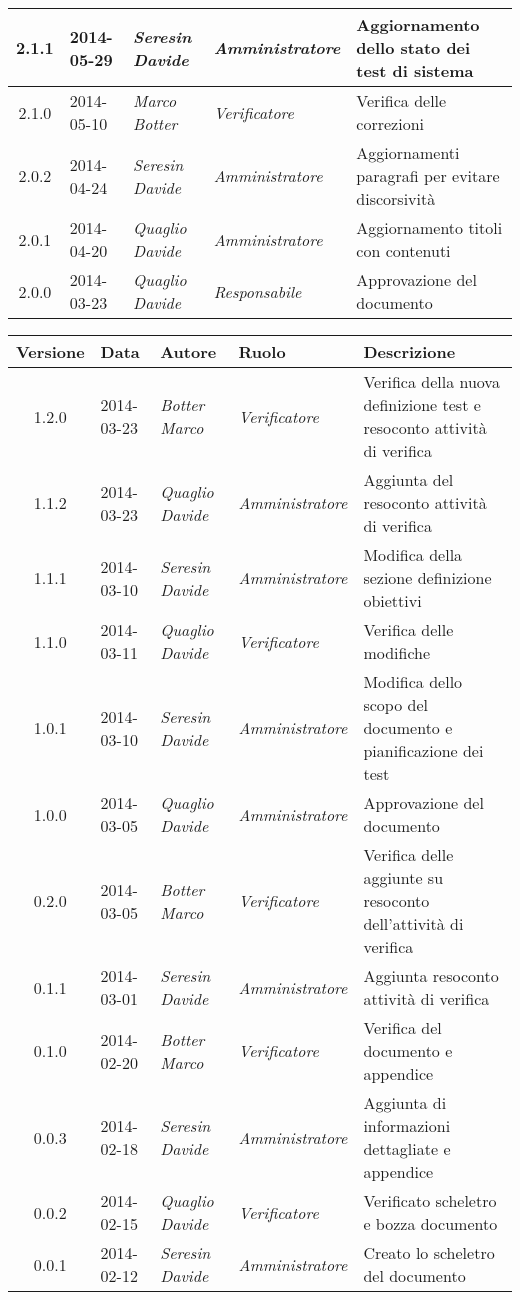 \begin{small}
\begin{tabular}{|c|p{1.8cm}|p{2.8cm}|p{2.8cm}|p{3.5cm}|}
\hline
2.1.1 & 2014-05-29 & 
\textit{Seresin Davide} &
\textit{Amministratore} &  Aggiornamento dello stato dei test di sistema\\
\hline
2.1.0 & 2014-05-10 & 
\textit{Marco Botter} &
\textit{Verificatore} &  Verifica delle correzioni\\
\hline
2.0.2 & 2014-04-24 & 
\textit{Seresin Davide} &
\textit{Amministratore} &  Aggiornamenti paragrafi per evitare discorsività\\
\hline
2.0.1 & 2014-04-20 & 
\textit{Quaglio Davide} &
\textit{Amministratore} &  Aggiornamento titoli con contenuti\\
\hline
2.0.0 & 2014-03-23 & 
\textit{Quaglio Davide} &
\textit{Responsabile} &  Approvazione del documento\\
\hline
\end{tabular}


\begin{tabular}{|c|p{1.8cm}|p{2.8cm}|p{2.8cm}|p{3.5cm}|}
\hline
Versione & Data & Autore & Ruolo & Descrizione \\
\hline
\hline
1.2.0 & 2014-03-23 & 
\textit{Botter Marco} &
\textit{Verificatore} &  Verifica della nuova definizione test e resoconto attività di verifica\\
\hline
1.1.2 & 2014-03-23 & 
\textit{Quaglio Davide} &
\textit{Amministratore} &  Aggiunta del resoconto attività di verifica\\
\hline
1.1.1 & 2014-03-10 & 
\textit{Seresin Davide} &
\textit{Amministratore} &  Modifica della sezione definizione obiettivi\\
\hline
1.1.0 & 2014-03-11 & 
\textit{Quaglio Davide} &
\textit{Verificatore} &  Verifica delle modifiche\\
\hline
1.0.1 & 2014-03-10 & 
\textit{Seresin Davide} &
\textit{Amministratore} &  Modifica dello scopo del documento e pianificazione dei test\\
\hline
1.0.0 & 2014-03-05 & 
\textit{Quaglio Davide} &
\textit{Amministratore} &  Approvazione del documento\\
\hline
0.2.0 & 2014-03-05 & 
\textit{Botter Marco} &
\textit{Verificatore} &  Verifica delle aggiunte su resoconto dell'attività di verifica\\
\hline
0.1.1 & 2014-03-01 & 
\textit{Seresin Davide} &
\textit{Amministratore} &  Aggiunta resoconto attività di verifica\\
\hline
0.1.0 & 2014-02-20 & 
\textit{Botter Marco} &
\textit{Verificatore} &  Verifica del documento e appendice\\
\hline
0.0.3 & 2014-02-18 & 
\textit{Seresin Davide} &
\textit{Amministratore} &  Aggiunta di informazioni dettagliate e appendice\\
\hline
0.0.2 & 2014-02-15 & 
\textit{Quaglio Davide} &
\textit{Verificatore} &  Verificato scheletro e bozza documento\\
\hline
0.0.1 & 2014-02-12 & 
\textit{Seresin Davide} &
\textit{Amministratore} &  Creato lo scheletro del documento\\
\hline
\end{tabular}\\
\end{small}